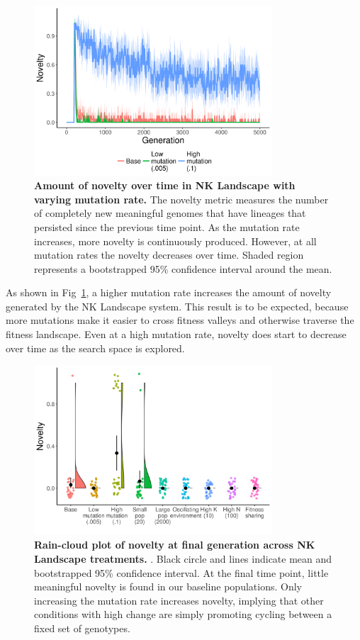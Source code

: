 \documentclass[letterpaper]{article}
\begin{document}
\begin{figure}
    \centering
\includegraphics[width=3.5in]{figs/dolson.novelty_mean_mut_rate.png}
\caption{\textbf{Amount of novelty over time in NK Landscape with varying mutation rate.} The novelty metric measures the number of completely new meaningful genomes that have lineages that persisted since the previous time point. As the mutation rate increases, more novelty is continuously produced. However, at all mutation rates the novelty decreases over time. Shaded region represents a bootstrapped 95\% confidence interval around the mean.\label{novelty_time}}
\end{figure}

As shown in Fig~\ref{novelty_time}, a higher mutation rate increases the amount of novelty generated by the NK Landscape system. This result is to be expected, because more mutations make it easier to cross fitness valleys and otherwise traverse the fitness landscape. Even at a high mutation rate, novelty does start to decrease over time as the search space is explored.

\begin{figure}
    \centering
\includegraphics[width=3.5in]{figs/dolson.noveltyboxplots.png}
\caption{\textbf{Rain-cloud plot of novelty at final generation across NK Landscape treatments.} . Black circle and lines indicate mean and bootstrapped 95\% confidence interval. At the final time point, little meaningful novelty is found in our baseline populations. Only increasing the mutation rate increases novelty, implying that other conditions with high change are simply promoting cycling between a fixed set of genotypes.\label{novelty}}
\end{figure}
\end{document}
